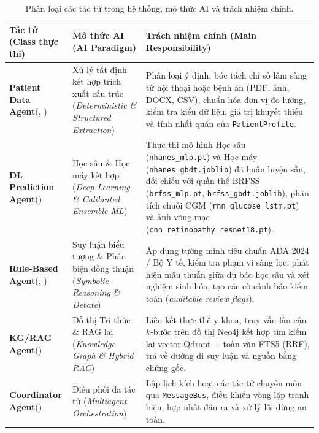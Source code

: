 \begin{table}[htbp]
\centering
\caption{Phân loại các tác tử trong hệ thống, mô thức AI và trách nhiệm chính.}
\label{tab:agent-classification}
\footnotesize
\renewcommand{\arraystretch}{1.1}
\begin{tabularx}{\linewidth}{@{}L{3.7cm}L{3.2cm}Y@{}}
\toprule
\textbf{Tác tử (Class thực thi)} & \textbf{Mô thức AI (AI Paradigm)} & \textbf{Trách nhiệm chính (Main Responsibility)} \\
\midrule
\textbf{Patient Data Agent}\newline (, ) &
Xử lý tất định kết hợp trích xuất cấu trúc (\emph{Deterministic \& Structured Extraction}) &
Phân loại ý định, bóc tách chỉ số lâm sàng từ hội thoại hoặc bệnh án (PDF, ảnh, DOCX, CSV), chuẩn hóa đơn vị đo lường, kiểm tra kiểu dữ liệu, giá trị khuyết thiếu và tính nhất quán của \texttt{PatientProfile}. \\
\addlinespace[3pt]
\textbf{DL Prediction Agent}\newline () &
Học sâu \& Học máy kết hợp (\emph{Deep Learning \& Calibrated Ensemble ML}) &
Thực thi mô hình Học sâu (\texttt{nhanes\_mlp.pt}) và Học máy (\texttt{nhanes\_gbdt.joblib}) đã huấn luyện sẵn, đối chiếu với quần thể BRFSS (\texttt{brfss\_mlp.pt}, \texttt{brfss\_gbdt.joblib}), phân tích chuỗi CGM (\texttt{rnn\_glucose\_lstm.pt}) và ảnh võng mạc (\texttt{cnn\_retinopathy\_resnet18.pt}). \\
\addlinespace[3pt]
\textbf{Rule-Based Agent}\newline (, ) &
Suy luận biểu tượng \& Phản biện đồng thuận (\emph{Symbolic Reasoning \& Debate}) &
Áp dụng tường minh tiêu chuẩn ADA 2024 / Bộ Y tế, kiểm tra phạm vi sàng lọc, phát hiện mâu thuẫn giữa dự báo học sâu và xét nghiệm sinh hóa, tạo các cờ cảnh báo kiểm toán (\emph{auditable review flags}). \\
\addlinespace[3pt]
\textbf{KG/RAG Agent}\newline () &
Đồ thị Tri thức \& RAG lai (\emph{Knowledge Graph \& Hybrid RAG}) &
Liên kết thực thể y khoa, truy vấn lân cận $k$-bước trên đồ thị Neo4j kết hợp tìm kiếm lai vector Qdrant + toàn văn FTS5 (RRF), trả về đường đi suy luận và nguồn bằng chứng gốc. \\
\addlinespace[3pt]
\textbf{Coordinator Agent}\newline () &
Điều phối đa tác tử (\emph{Multiagent Orchestration}) &
Lập lịch kích hoạt các tác tử chuyên môn qua \texttt{MessageBus}, điều khiển vòng lặp tranh biện, hợp nhất đầu ra và xử lý lỗi dừng an toàn. \\

\end{tabularx}
\end{table}
